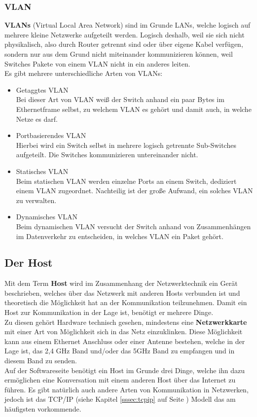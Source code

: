 \documentclass[12pt,a4paper]{report}
\begin{document}
\subsubsection{VLAN}\label{sssec:vlan}
\textbf{VLANs} (Virtual Local Area Network) sind im Grunde LANs, welche logisch auf mehrere kleine Netzwerke aufgeteilt werden. Logisch deshalb, weil sie sich nicht physikalisch, also durch Router getrennt sind oder über eigene Kabel verfügen, sondern nur aus dem Grund nicht miteinander kommunizieren können, weil Switches Pakete von einem VLAN nicht in ein anderes leiten.\\
Es gibt mehrere unterschiedliche Arten von VLANs:\\
\begin{itemize}
\item Getaggtes VLAN\\
Bei dieser Art von VLAN weiß der Switch anhand ein paar Bytes im Ethernetframe selbst, zu welchem VLAN es gehört und damit auch, in welche Netze es darf.
\item Portbasierendes VLAN\\
Hierbei wird ein Switch selbst in mehrere logisch getrennte Sub-Switches aufgeteilt. Die Switches kommunizieren untereinander nicht.
\item Statisches VLAN\\
Beim statischen VLAN werden einzelne Ports an einem Switch, dediziert einem VLAN zugeordnet. Nachteilig ist der große Aufwand, ein solches VLAN zu verwalten.
\item Dynamisches VLAN\\
Beim dynamischen VLAN versucht der Switch anhand von Zusammenhängen im Datenverkehr zu entscheiden, in welches VLAN ein Paket gehört. 
\end{itemize}

\subsection{Der Host}
Mit dem Term \textbf{Host} wird im Zusammenhang der Netzwerktechnik ein Gerät beschrieben, welches über das Netzwerk mit anderen Hosts verbunden ist und theoretisch die Möglichkeit hat an der Kommunikation teilzunehmen. Damit ein Host zur Kommunikation in der Lage ist, benötigt er mehrere Dinge.\\
Zu diesen gehört Hardware technisch gesehen, mindestens eine \textbf{Netzwerkkarte} mit einer Art von Möglichkeit sich in das Netz einzuklinken. Diese Möglichkeit kann aus einem Ethernet Anschluss oder einer Antenne bestehen, welche in der Lage ist, das 2,4 GHz Band und/oder das 5GHz Band zu empfangen und in diesem Band zu senden.\\
Auf der Softwareseite benötigt ein Host im Grunde drei Dinge, welche ihn dazu ermöglichen eine Konversation mit einem anderen Host über das Internet zu führen. Es gibt natürlich auch andere Arten von Kommunikation in Netzwerken, jedoch ist das TCP/IP (siehe Kapitel \ref{sssec:tcpip} auf Seite \pageref{sssec:tcpip}) Modell das am häufigsten vorkommende. 
\end{document}
